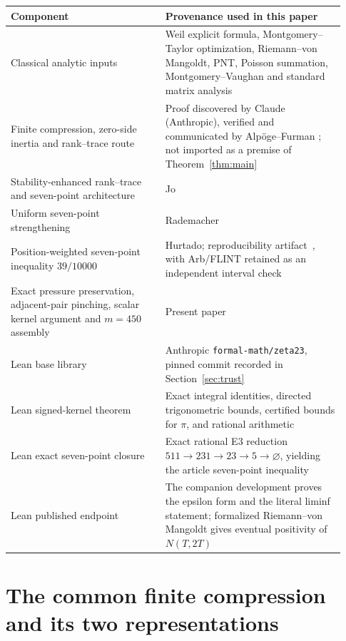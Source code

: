 \documentclass[11pt]{article}
\begin{document}
\begin{center}
\small
\begin{tabular}{@{}p{0.43\linewidth}p{0.50\linewidth}@{}}
\toprule
Component & Provenance used in this paper\\
\midrule
Classical analytic inputs & Weil explicit formula, Montgomery--Taylor optimization,
Riemann--von Mangoldt, PNT, Poisson summation, Montgomery--Vaughan and standard
matrix analysis\\
Finite compression, zero-side inertia and rank--trace route & Proof discovered by
Claude (Anthropic), verified and communicated by Alpöge--Furman
\cite{AlpogeFurman26,Anthropic26}; not imported as a premise of
Theorem~\ref{thm:main}\\
Stability-enhanced rank--trace and seven-point architecture & Jo~\cite{Jo26}\\
Uniform seven-point strengthening & Rademacher~\cite{Rademacher26}\\
Position-weighted seven-point inequality \(39/10000\) & Hurtado;
reproducibility artifact~\cite{Hurtado26Artifact}, with Arb/FLINT retained as
an independent interval check\\
Exact pressure preservation, adjacent-pair pinching, scalar kernel argument and
\(m=450\) assembly & Present paper\\
Lean base library & Anthropic \texttt{formal-math/zeta23}, pinned commit recorded
in Section~\ref{sec:trust}~\cite{AnthropicFormal26}\\
Lean signed-kernel theorem & Exact integral identities, directed
trigonometric bounds, certified bounds for \(\pi\), and rational arithmetic\\
Lean exact seven-point closure & Exact rational E3 reduction
\(511\to231\to23\to5\to\varnothing\), yielding the article seven-point
inequality\\
Lean published endpoint & The companion development proves the epsilon form and
the literal liminf statement; formalized Riemann--von Mangoldt gives eventual
positivity of \(N(T,2T)\)\\
\bottomrule
\end{tabular}
\end{center}

\section{The common finite compression and its two representations}
\label{sec:common-compression}
\end{document}
